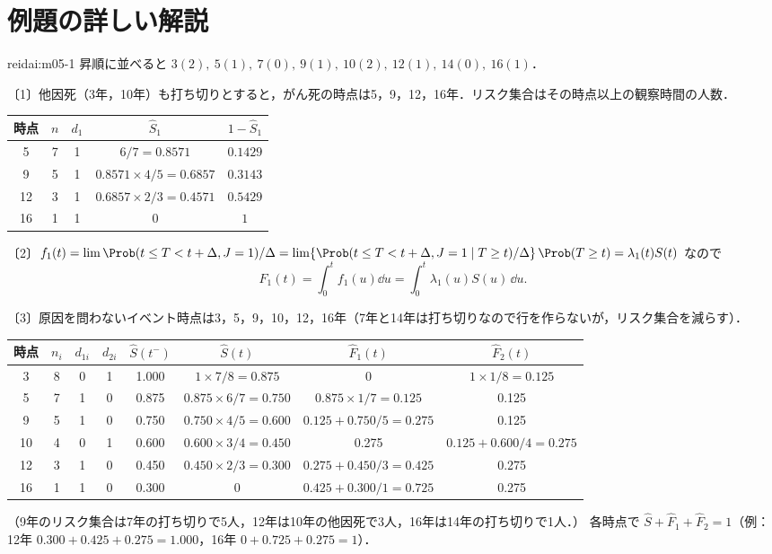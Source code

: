 \section{例題の詳しい解説}\label{sec:m05-kaisetsu}
\begin{kaitou}{reidai:m05-1}
昇順に並べると $3(2),\ 5(1),\ 7(0),\ 9(1),\ 10(2),\ 12(1),\ 14(0),\ 16(1)$．

〔1〕他因死（3年，10年）も打ち切りとすると，がん死の時点は5，9，12，16年．リスク集合はその時点以上の観察時間の人数．
\begin{center}\small
\begin{tabular}{@{}ccccc@{}}
\toprule
時点 & $n$ & $d_1$ & $\hat S_1$ & $1-\hat S_1$\\
\midrule
5 & 7 & 1 & $6/7=0.8571$ & $0.1429$\\
9 & 5 & 1 & $0.8571\times4/5=0.6857$ & $0.3143$\\
12 & 3 & 1 & $0.6857\times2/3=0.4571$ & $0.5429$\\
16 & 1 & 1 & $0$ & $1$\\
\bottomrule
\end{tabular}
\end{center}

〔2〕$f_1(t)=\lim\Prob(t\le T<t+\Delta,J=1)/\Delta=\lim\{\Prob(t\le T<t+\Delta,J=1\mid T\ge t)/\Delta\}\,\Prob(T\ge t)=\lambda_1(t)S(t)$ なので
\[
F_1(t)=\int_0^tf_1(u)\dd u=\int_0^t\lambda_1(u)S(u)\,\dd u .
\]

〔3〕原因を問わないイベント時点は3，5，9，10，12，16年（7年と14年は打ち切りなので行を作らないが，リスク集合を減らす）．
\begin{center}\footnotesize\setlength{\tabcolsep}{4pt}
\begin{tabular}{@{}cccccccc@{}}
\toprule
時点 & $n_i$ & $d_{1i}$ & $d_{2i}$ & $\hat S(t^-)$ & $\hat S(t)$ & $\hat F_1(t)$ & $\hat F_2(t)$\\
\midrule
3 & 8 & 0 & 1 & 1.000 & $1\times7/8=0.875$ & 0 & $1\times1/8=0.125$\\
5 & 7 & 1 & 0 & 0.875 & $0.875\times6/7=0.750$ & $0.875\times1/7=0.125$ & 0.125\\
9 & 5 & 1 & 0 & 0.750 & $0.750\times4/5=0.600$ & $0.125+0.750/5=0.275$ & 0.125\\
10 & 4 & 0 & 1 & 0.600 & $0.600\times3/4=0.450$ & 0.275 & $0.125+0.600/4=0.275$\\
12 & 3 & 1 & 0 & 0.450 & $0.450\times2/3=0.300$ & $0.275+0.450/3=0.425$ & 0.275\\
16 & 1 & 1 & 0 & 0.300 & 0 & $0.425+0.300/1=0.725$ & 0.275\\
\bottomrule
\end{tabular}
\end{center}
（9年のリスク集合は7年の打ち切りで5人，12年は10年の他因死で3人，16年は14年の打ち切りで1人．）
各時点で $\hat S+\hat F_1+\hat F_2=1$（例：12年 $0.300+0.425+0.275=1.000$，16年 $0+0.725+0.275=1$）．


\end{kaitou}
